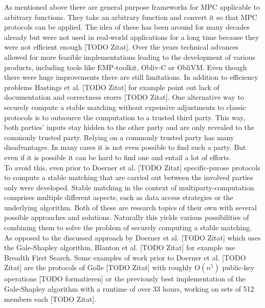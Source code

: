 As mentioned above there are general purpose frameworks for MPC applicable to arbitrary functions. They take an arbitrary function and convert it so that MPC protocols can be applied. The idea of these has been around for many decades already but were not used in real-world applications for a long time because they were not efficient enough [TODO Zitat]. Over the years technical advances allowed for more feasible implementations leading to the development of various products, including tools like EMP-toolkit, Obliv-C or ObliVM. Even though there were huge improvements there are still limitations. In addition to efficiency problems Hastings et al. [TODO Zitat] for example point out lack of documentation and correctness erorrs [TODO Zitat].
One alternative way to securely compute a stable matching without expensive adjustments to classic protocols is to outsource the computation to a trusted third party. This way, both parties' inputs stay hidden to the other party and are only revealed to the commonly trusted party.
Relying on a commonly trusted party has many disadvantages. In many cases it is not even possible to find such a party. But even if it is possible it can be hard to find one and entail a lot of efforts. \\
To avoid this, even prior to Doerner et al. [TODO Zitat] specific-purose protocols to compute a stable matching that are carried out between the involved parties only were developed. Stable matching in the context of multiparty-computation comprises multiple different aspects, such as data access strategies or the underlying algorithm. Both of these are research topics of their own with several possible approaches and solutions. Naturally this yields various possibilities of combining them to solve the problem of securely computing a stable matching. As opposed to the discussed approach by Doerner et al. [TODO Zitat] which uses the Gale-Shapley algorithm, Blanton et al. [TODO Zitat] for example use Breadth First Search. Some examples of work prior to Doerner et al. [TODO Zitat] are the protocols of Golle [TODO Zitat] with roughly O$(n^5)$ public-key operations [TODO formatieren] or the previously best implementation of the Gale-Shapley algorithm with a runtime of over 33 hours, working on sets of 512 members each [TODO Zitat].